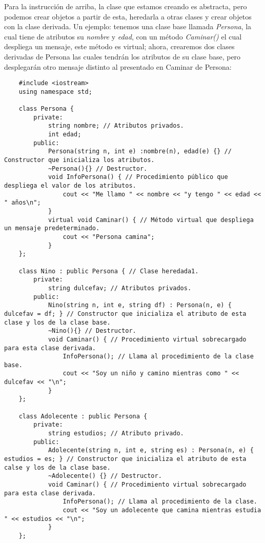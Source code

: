 Para la instrucción de arriba, la clase que estamos creando es abstracta, pero podemos crear objetos a partir de esta, heredarla a otras clases y crear objetos con la clase derivada. Un ejemplo: tenemos una clase base llamada \textit{Persona}, la cual tiene de atributos su \textit{nombre} y \textit{edad}, con un método \textit{Caminar()} el cual despliega un mensaje, este método es virtual; ahora, crearemos dos clases derivadas de Persona las cuales tendrán los atributos de su clase base, pero desplegarán otro mensaje distinto al presentado en Caminar de Persona:
\begin{lstlisting}
    #include <iostream>
    using namespace std;
    
    class Persona {
        private:
            string nombre; // Atributos privados.
            int edad;
        public:
            Persona(string n, int e) :nombre(n), edad(e) {} // Constructor que inicializa los atributos.
            ~Persona(){} // Destructor.
            void InfoPersona() { // Procedimiento público que despliega el valor de los atributos.
                cout << "Me llamo " << nombre << "y tengo " << edad << " años\n";
            }
            virtual void Caminar() { // Método virtual que despliega un mensaje predeterminado.
                cout << "Persona camina";
            }
    };

    class Nino : public Persona { // Clase heredada1.
        private:
            string dulcefav; // Atributos privados.
        public:
            Nino(string n, int e, string df) : Persona(n, e) { dulcefav = df; } // Constructor que inicializa el atributo de esta clase y los de la clase base.
            ~Nino(){} // Destructor.
            void Caminar() { // Procedimiento virtual sobrecargado para esta clase derivada.
                InfoPersona(); // Llama al procedimiento de la clase base.
                cout << "Soy un niño y camino mientras como " << dulcefav << "\n";
            }
    };

    class Adolecente : public Persona {
        private:
            string estudios; // Atributo privado.
        public:
            Adolecente(string n, int e, string es) : Persona(n, e) { estudios = es; } // Constructor que inicializa el atributo de esta calse y los de la clase base.
            ~Adolecente() {} // Destructor.
            void Caminar() { // Procedimiento virtual sobrecargado para esta clase derivada.
                InfoPersona(); // Llama al procedimiento de la clase.
                cout << "Soy un adolecente que camina mientras estudia " << estudios << "\n";
            }
    };


\end{lstlisting}
